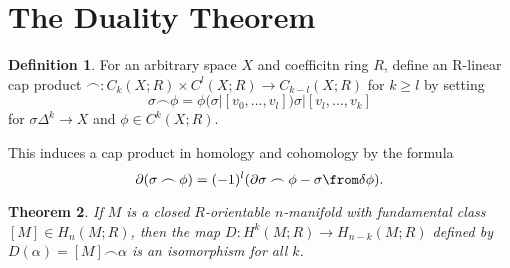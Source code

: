 \documentclass[psamsfonts]{amsart}
\newtheorem{theorem}{Theorem}[section]
\theoremstyle{definition}
\newtheorem{defn}[theorem]{Definition}
\theoremstyle{remark}
\numberwithin{equation}{section}
\begin{document}
	\section{The Duality Theorem}
		\begin{defn}
			For an arbitrary space $X$ and coefficitn ring $R$, define an
			R-linear cap product $\frown : C_k(X;R)\times C^l(X;R) \to C_{k-l}
			(X;R)$ for $k \geq l$ by setting
				\begin{equation}
					\sigma \frown \phi = \phi(\sigma | [v_0,...,v_l]) \sigma | [v_l,...,v_k]
				\end{equation}
				for $\sigma \Delta^k \to X$ and $\phi \in C^k(X;R)$.
		\end{defn}
		This induces a cap product in homology and cohomology by the formula
		\begin{equation}
			\partial (\sigma \frown \phi) = (-1)^l (\partial \sigma \frown \phi - \sigma \from \delta \phi).
		\end{equation}
		\begin{theorem}
			If $M$ is a closed $R$-orientable $n$-manifold with fundamental class
			$[M] \in H_n(M;R)$, then the map $D: H^k(M;R) \to H_{n-k}(M;R)$ defined 
			by $D(\alpha) = [M]\frown \alpha$ is an isomorphism for all $k$.
		\end{theorem}
\end{document}
